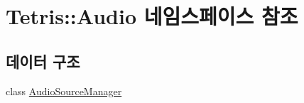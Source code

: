 \hypertarget{namespace_tetris_1_1_audio}{}\section{Tetris\+:\+:Audio 네임스페이스 참조}
\label{namespace_tetris_1_1_audio}
\subsection*{데이터 구조}
\begin{DoxyCompactItemize}
\item 
class \hyperlink{class_tetris_1_1_audio_1_1_audio_source_manager}{Audio\+Source\+Manager}
\end{DoxyCompactItemize}
